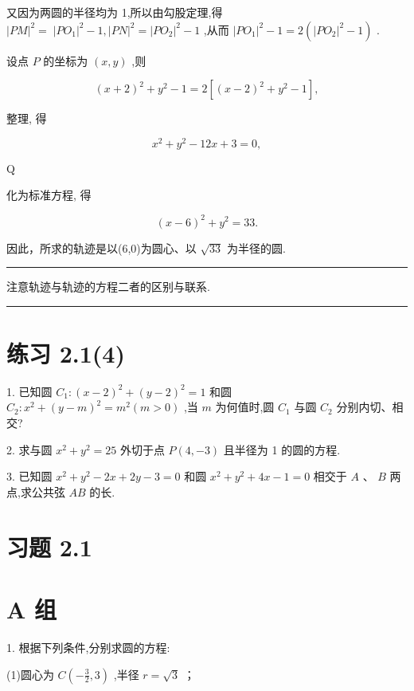 \documentclass[10pt]{article}
\newcommand{\HRule}{\begin{center}\rule{0.9\linewidth}{0.2mm}\end{center}}
\begin{document}
又因为两圆的半径均为 1,所以由勾股定理,得 \({\left| PM\right| }^{2} = \; {\left| P{O}_{1}\right| }^{2} - 1,{\left| PN\right| }^{2} = {\left| P{O}_{2}\right| }^{2} - 1\) ,从而 \({\left| P{O}_{1}\right| }^{2} - 1 = 2\left( {{\left| P{O}_{2}\right| }^{2} - 1}\right)\) .

设点 \(P\) 的坐标为 \(\left( {x,y}\right)\) ,则

\[
{\left( x + 2\right) }^{2} + {y}^{2} - 1 = 2\left\lbrack  {{\left( x - 2\right) }^{2} + {y}^{2} - 1}\right\rbrack  ,
\]

整理, 得

\[
{x}^{2} + {y}^{2} - {12x} + 3 = 0,
\]

Q

化为标准方程, 得

\[
{\left( x - 6\right) }^{2} + {y}^{2} = {33}.
\]

因此，所求的轨迹是以(6,0)为圆心、以 \(\sqrt{33}\) 为半径的圆.

\HRule

注意轨迹与轨迹的方程二者的区别与联系.

\HRule

\section*{练习 2.1(4)}

1. 已知圆 \({C}_{1} : {\left( x - 2\right) }^{2} + {\left( y - 2\right) }^{2} = 1\) 和圆 \({C}_{2} : {x}^{2} + {\left( y - m\right) }^{2} = {m}^{2}\left( {m > 0}\right)\) ,当 \(m\) 为何值时,圆 \({C}_{1}\) 与圆 \({C}_{2}\) 分别内切、相交?

2. 求与圆 \({x}^{2} + {y}^{2} = {25}\) 外切于点 \(P\left( {4, - 3}\right)\) 且半径为 1 的圆的方程.

3. 已知圆 \({x}^{2} + {y}^{2} - {2x} + {2y} - 3 = 0\) 和圆 \({x}^{2} + {y}^{2} + {4x} - 1 = 0\) 相交于 \(A\text{ 、 }B\) 两点,求公共弦 \({AB}\) 的长.

\section*{习题 2.1}

\section*{A 组}

1. 根据下列条件,分别求圆的方程:

(1)圆心为 \(C\left( {-\frac{3}{2},3}\right)\) ,半径 \(r = \sqrt{3}\) ；
\end{document}
